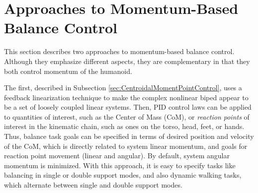 \documentclass{llncs}
\begin{document}




\section{Approaches to Momentum-Based Balance Control}
\label{sec:approaches}





This section describes two approaches to momentum-based balance control.
Although they emphasize different aspects, they are complementary in that they both control momentum of the humanoid.

The first, described in Subsection \ref{sec:CentroidalMomentPointControl}, uses a feedback linearization technique 
to make the complex nonlinear biped appear to be a set of loosely coupled linear systems.
Then, PID control laws can be applied to quantities of interest, such as the Center of Mass (CoM), or
\textit{reaction points} of interest in the kinematic chain, such as ones on the torso, head, feet, or hands.
Thus, balance task goals can be specified in terms of desired position and velocity of the CoM, which is
directly related to system linear momentum, and goals for reaction point movement (linear and angular).
By default, system angular momentum is minimized.
With this approach, it is easy to specify tasks like balancing in single or double support modes, 
and also dynamic walking tasks, which alternate between single
and double support modes.
\end{document}
